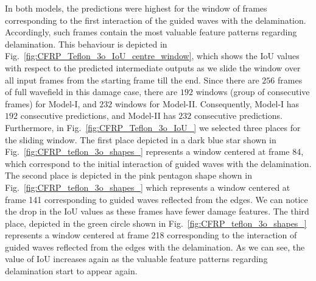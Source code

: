 \begin{sloppypar}
	In both models, the predictions were highest for the window of frames corresponding to the first interaction of the guided waves with the delamination.
	Accordingly, such frames contain the most valuable feature patterns regarding delamination. 
	This behaviour is depicted in Fig.~\ref{fig:CFRP_Teflon_3o_IoU_centre_window}, which shows the IoU values with respect to the predicted intermediate outputs as we slide the window over all input frames from the starting frame till the end.
	Since there are \(256\) frames of full wavefield in this damage case, there are \(192\) windows (group of consecutive frames) for Model-I, and \(232\) windows for Model-II.
	Consequently, Model-I has \(192\) consecutive predictions, and Model-II has \(232\) consecutive predictions.
	Furthermore, in Fig.~\ref{fig:CFRP_Teflon_3o_IoU_} we selected three places for the sliding window. 
	The first place depicted in a dark blue star shown in Fig.~\ref{fig:CFRP_teflon_3o_shapes_} represents a window centered at frame 84, which correspond to the initial interaction of guided waves with the delamination.
	The second place is depicted in the pink pentagon shape shown in Fig.~\ref{fig:CFRP_teflon_3o_shapes_} which represents a window centered at frame 141 corresponding to guided waves reflected from the edges.
	We can notice the drop in the IoU values as these frames have fewer damage features.
	The third place, depicted in the green circle shown in Fig.~\ref{fig:CFRP_teflon_3o_shapes_} represents a window centered at frame 218 corresponding to the interaction of guided waves reflected from the edges with the delamination.
	As we can see, the value of IoU increases again as the valuable feature patterns regarding delamination start to appear again.
	

\end{sloppypar}
